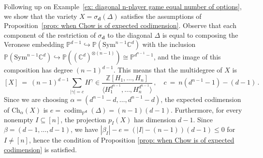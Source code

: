 \documentclass[12pt]{article}
\theoremstyle{definition}
\newenvironment{example}
{\pushQED{\qed}\renewcommand{\qedsymbol}{$\diamond$}\examplex}
{\popQED\endexamplex}
\newcommand{\C}{{\mathbb C}}
\newcommand{\Z}{{\mathbb Z}}
\newcommand{\PP}{{\mathbb P}}
\def\bd{{\boldsymbol{d}}}
\def\codim{\operatorname{codim}}
\begin{document}
\begin{example}
Following up on Example~\ref{ex: diagonal n-player game equal number of options}, we show that the variety $X=\sigma_\bd(\Delta)$ satisfies the assumptions of Proposition~\ref{prop: when Chow is of expected codimension}. Observe that each component of the restriction of $\sigma_\bd$ to the diagonal $\Delta$ is equal to composing the Veronese embedding $\PP^{d-1}\hookrightarrow\PP(\mathrm{Sym}^{n-1}\C^d)$ with the inclusion $\PP(\mathrm{Sym}^{n-1}\C^d)\hookrightarrow\PP((\C^d)^{\otimes(n-1)})\cong\PP^{d^{n-1}-1}$, and the image of this composition has degree $(n-1)^{d-1}$. This means that the multidegree of $X$ is
\[
    [X]\ =\ (n-1)^{d-1}\sum_{|\gamma|=c}H^\gamma\in\frac{\Z[H_1,\ldots,H_n]}{\langle H_1^{d^{n-1}},\ldots,H_n^{d^{n-1}}\rangle}\,,\quad c\ =\ n(d^{n-1}-1)-(d-1)\,.
\]
Since we are choosing $\alpha=(d^{n-1}-d,\ldots,d^{n-1}-d)$, the expected codimension of $\mathrm{Ch}_\alpha(X)$ is $e=\codim_{\PP^\bd}(\Delta)=(n-1)(d-1)$. Furthermore, for every nonempty $I\subseteq[n]$, the projection $p_I(X)$ has dimension $d-1$. Since $\beta=(d-1,\ldots,d-1)$, we have $|\beta_I|-e=(|I|-(n-1))(d-1)\le 0$ for $I\neq [n]$, hence the condition of Proposition \ref{prop: when Chow is of expected codimension} is satisfied.
\end{example}
\end{document}
